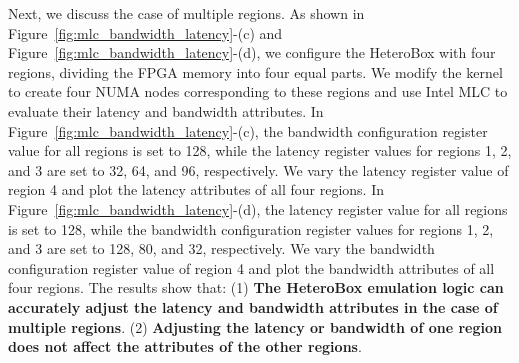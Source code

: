 



Next, we discuss the case of multiple regions. As shown in Figure~\ref{fig:mlc_bandwidth_latency}-(c) and Figure~\ref{fig:mlc_bandwidth_latency}-(d), we configure the HeteroBox with four regions, dividing the FPGA memory into four equal parts. We modify the kernel to create four NUMA nodes corresponding to these regions and use Intel MLC to evaluate their latency and bandwidth attributes.
In Figure~\ref{fig:mlc_bandwidth_latency}-(c), the bandwidth configuration register value for all regions is set to 128, while the latency register values for regions 1, 2, and 3 are set to 32, 64, and 96, respectively. We vary the latency register value of region 4 and plot the latency attributes of all four regions.
In Figure~\ref{fig:mlc_bandwidth_latency}-(d), the latency register value for all regions is set to 128, while the bandwidth configuration register values for regions 1, 2, and 3 are set to 128, 80, and 32, respectively. We vary the bandwidth configuration register value of region 4 and plot the bandwidth attributes of all four regions.
The results show that: (1) \textbf{The HeteroBox emulation logic can accurately adjust the latency and bandwidth attributes in the case of multiple regions}. (2) \textbf{Adjusting the latency or bandwidth of one region does not affect the attributes of the other regions}.










